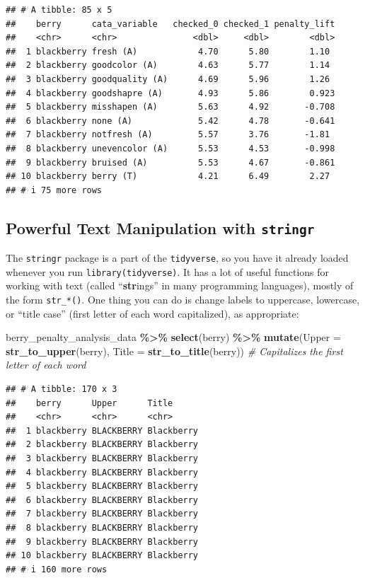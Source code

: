 \documentclass[
]{book}
\newenvironment{Shaded}{\begin{snugshade}}{\end{snugshade}}
\newcommand{\AttributeTok}[1]{\textcolor[rgb]{0.13,0.29,0.53}{#1}}
\newcommand{\CommentTok}[1]{\textcolor[rgb]{0.56,0.35,0.01}{\textit{#1}}}
\newcommand{\FunctionTok}[1]{\textcolor[rgb]{0.13,0.29,0.53}{\textbf{#1}}}
\newcommand{\NormalTok}[1]{#1}
\newcommand{\SpecialCharTok}[1]{\textcolor[rgb]{0.81,0.36,0.00}{\textbf{#1}}}
\begin{document}
\begin{verbatim}
## # A tibble: 85 x 5
##    berry      cata_variable   checked_0 checked_1 penalty_lift
##    <chr>      <chr>               <dbl>     <dbl>        <dbl>
##  1 blackberry fresh (A)            4.70      5.80        1.10 
##  2 blackberry goodcolor (A)        4.63      5.77        1.14 
##  3 blackberry goodquality (A)      4.69      5.96        1.26 
##  4 blackberry goodshapre (A)       4.93      5.86        0.923
##  5 blackberry misshapen (A)        5.63      4.92       -0.708
##  6 blackberry none (A)             5.42      4.78       -0.641
##  7 blackberry notfresh (A)         5.57      3.76       -1.81 
##  8 blackberry unevencolor (A)      5.53      4.53       -0.998
##  9 blackberry bruised (A)          5.53      4.67       -0.861
## 10 blackberry berry (T)            4.21      6.49        2.27 
## # i 75 more rows
\end{verbatim}

\hypertarget{powerful-text-manipulation-with-stringr}{%
\subsection{\texorpdfstring{Powerful Text Manipulation with \texttt{stringr}}{Powerful Text Manipulation with stringr}}\label{powerful-text-manipulation-with-stringr}}

The \texttt{stringr} package is a part of the \texttt{tidyverse}, so you have it already loaded whenever you run \texttt{library(tidyverse)}. It has a lot of useful functions for working with text (called ``\textbf{str}ings'' in many programming languages), mostly of the form \texttt{str\_*()}. One thing you can do is change labels to uppercase, lowercase, or ``title case'' (first letter of each word capitalized), as appropriate:

\begin{Shaded}
\begin{Highlighting}[]
\NormalTok{berry\_penalty\_analysis\_data }\SpecialCharTok{\%\textgreater{}\%}
  \FunctionTok{select}\NormalTok{(berry) }\SpecialCharTok{\%\textgreater{}\%}
  \FunctionTok{mutate}\NormalTok{(}\AttributeTok{Upper =} \FunctionTok{str\_to\_upper}\NormalTok{(berry),}
         \AttributeTok{Title =} \FunctionTok{str\_to\_title}\NormalTok{(berry)) }\CommentTok{\# Capitalizes the first letter of each word}
\end{Highlighting}
\end{Shaded}

\begin{verbatim}
## # A tibble: 170 x 3
##    berry      Upper      Title     
##    <chr>      <chr>      <chr>     
##  1 blackberry BLACKBERRY Blackberry
##  2 blackberry BLACKBERRY Blackberry
##  3 blackberry BLACKBERRY Blackberry
##  4 blackberry BLACKBERRY Blackberry
##  5 blackberry BLACKBERRY Blackberry
##  6 blackberry BLACKBERRY Blackberry
##  7 blackberry BLACKBERRY Blackberry
##  8 blackberry BLACKBERRY Blackberry
##  9 blackberry BLACKBERRY Blackberry
## 10 blackberry BLACKBERRY Blackberry
## # i 160 more rows
\end{verbatim}
\end{document}
